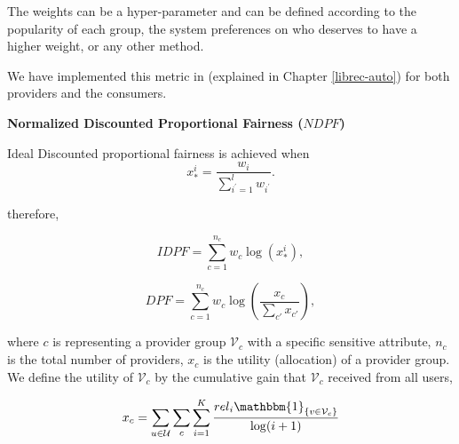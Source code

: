         The weights can be a hyper-parameter and can be defined according to the popularity of each group, the system preferences on who deserves to have a higher weight, or any other method.
        
        We have implemented this metric in \libauto{} (explained in Chapter \ref{librec-auto}) for both providers and the consumers.
        
        
        
        
        \textbf{Normalized Discounted Proportional Fairness ($NDPF$)}

        Ideal Discounted proportional fairness is achieved when
        \begin{equation}
        x_*^i=\frac{w_i}{\sum_{i^{'}=1}^lw_{i^{'}}}.
        \end{equation}
        
        therefore,
        
        \begin{equation*}
            \text{$IDPF$}=\sum_{c=1}^{n_c} w_c \log\left(x_*^i\right),
        \end{equation*}
        
        
        \begin{equation*}
            \text{$DPF$}=\sum_{c=1}^{n_c} w_c \log\left(\frac{x_c}{\sum_{c'}x_{c'}}\right),
        \end{equation*}
        
        where $c$ is representing a provider group $\mathcal V_c$ with a specific sensitive attribute, $n_c$ is the total number of providers, $x_c$ is the utility (allocation) of a provider group. We define the utility of $\mathcal V_c$ by the cumulative gain that $\mathcal V_c$ received from all users,
        
        \begin{equation*}
        x_c=\sum_{u\in\mathcal U}\sum_{c}\sum_{i=1}^K\frac{{rel}_i\mathbbm{1}_{\{v\in \mathcal V_{c}\}}}{\log(i+1)}
        \end{equation*}
        
